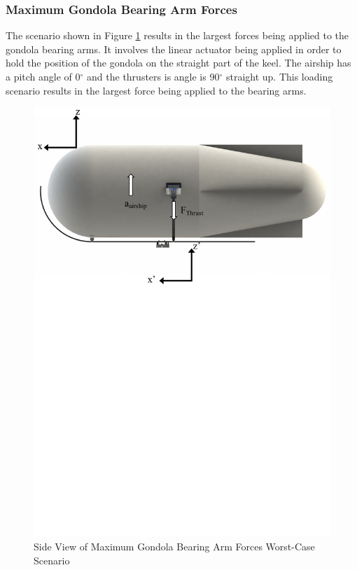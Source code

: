 \documentclass[../main.tex]{subfiles}
\begin{document}
\subsubsection*{Maximum Gondola Bearing Arm Forces}
The scenario shown in Figure \ref{fig:scenario2} results in the largest forces being applied to the gondola bearing arms. It involves the linear actuator being applied in order to hold the position of the gondola on the straight part of the keel. The airship has a pitch angle of 0$^{\circ}$ and the thrusters is angle is 90$^{\circ}$ straight up. This loading scenario results in the largest force being applied to the bearing arms.

\begin{figure}[H]
	\centering
	\includegraphics[width=1\textwidth]{img/analysis/scenario2.pdf}
	\caption{Side View of Maximum Gondola Bearing Arm Forces Worst-Case Scenario}
	\label{fig:scenario2}
\end{figure}
\end{document}
